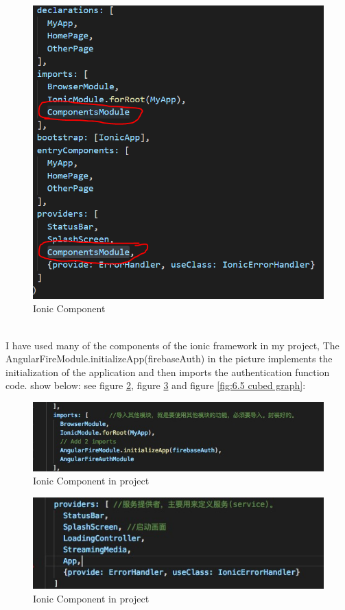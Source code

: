 \begin{figure}[h]
	\centering
	\includegraphics[scale=0.3]{img/ioniccomponent.png}
	\caption{Ionic Component}
	\label{fig:6.2 cubed graph}
\end{figure} \\
I have used many of the components of the ionic framework in my project, The AngularFireModule.initializeApp(firebaseAuth) in the picture implements the initialization of the application and then imports the authentication function code. show below: see figure \ref{fig:6.3 cubed graph}, figure \ref{fig:6.4 cubed graph} and figure \ref{fig:6.5 cubed graph}:
\begin{figure}[h]
	\centering
	\includegraphics[scale=0.5]{img/ioniccomponent1.png}
	\caption{Ionic Component in project}
	\label{fig:6.3 cubed graph}
\end{figure}
\begin{figure}[h]
	\centering
	\includegraphics[scale=0.5]{img/ioniccomponent2.png}
	\caption{Ionic Component in project}
	\label{fig:6.4 cubed graph}
\end{figure}
